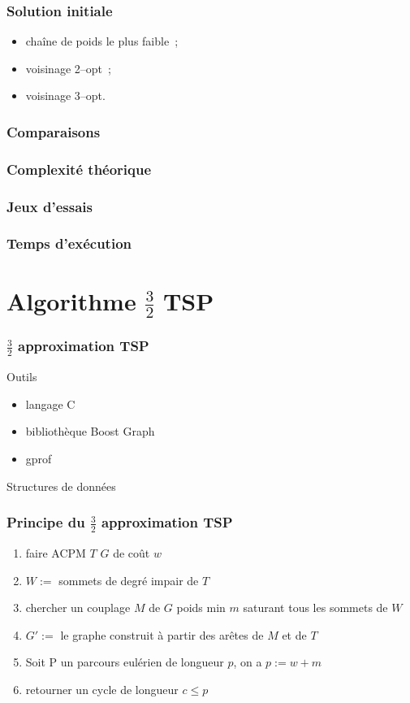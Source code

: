 \documentclass[french]{beamer}
\begin{document}
\begin{frame}
  \frametitle{Solution initiale}
  \begin{itemize}
  \item chaîne de poids le plus faible~;
  \item voisinage 2--opt~;
  \item voisinage 3--opt.
  \end{itemize}
\end{frame}


\begin{frame}
  \frametitle{Comparaisons}
\end{frame}

\begin{frame}
  \frametitle{Complexité théorique}
\end{frame}

\begin{frame}
  \frametitle{Jeux d'essais}
\end{frame}

\begin{frame}
  \frametitle{Temps d'exécution}
\end{frame}

\section{Algorithme $\frac{3}{2}$ TSP}

\begin{frame}
\frametitle{$\frac{3}{2}$ approximation TSP}
\begin{block}{Outils}
  \begin{itemize}
  \item langage C
  \item bibliothèque Boost Graph
  \item gprof
  \end{itemize}
\end{block}
\begin{block}{Structures de données}
\end{block}
\end{frame}

\begin{frame}
\frametitle{Principe du $\frac{3}{2}$ approximation TSP}
\begin{enumerate}
\item faire ACPM $T$ $G$ de coût $w$
\item $W := $ sommets de degré impair de $T$
\item chercher un couplage $M$ de $G$ poids min $m$ saturant tous les
sommets de $W$
\item $G' := $ le graphe construit à partir des arêtes de $M$ et de
$T$
\item Soit P un parcours eulérien de longueur $p$, on a $p:= w + m$
\item retourner un cycle de longueur $c \leq p$
\end{enumerate}
\end{frame}
\end{document}

